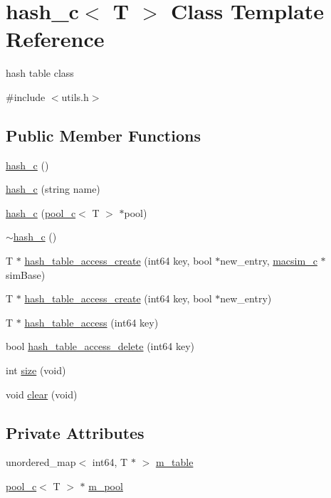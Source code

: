 \hypertarget{classhash__c}{
\section{hash\_\-c$<$ T $>$ Class Template Reference}
\label{classhash__c}
}


hash table class  




{\ttfamily \#include $<$utils.h$>$}

\subsection*{Public Member Functions}
\begin{DoxyCompactItemize}
\item 
\hyperlink{classhash__c_a0f4f335edcb32e2fdb006672e7326f49}{hash\_\-c} ()
\item 
\hyperlink{classhash__c_a9a52bfdeecbc6f7db1aec20febf5cbbf}{hash\_\-c} (string name)
\item 
\hyperlink{classhash__c_a9079a2d95bdb17c6f09b81676b6061c5}{hash\_\-c} (\hyperlink{classpool__c}{pool\_\-c}$<$ T $>$ $\ast$pool)
\item 
\hyperlink{classhash__c_a4784bb9b3bba26f1ce111b6321632c38}{$\sim$hash\_\-c} ()
\item 
T $\ast$ \hyperlink{classhash__c_a60af36fa5543c99fada8b0f2306ec1a7}{hash\_\-table\_\-access\_\-create} (int64 key, bool $\ast$new\_\-entry, \hyperlink{classmacsim__c}{macsim\_\-c} $\ast$simBase)
\item 
T $\ast$ \hyperlink{classhash__c_a866bf39c8a78a84e5fcbd0d45b8258ac}{hash\_\-table\_\-access\_\-create} (int64 key, bool $\ast$new\_\-entry)
\item 
T $\ast$ \hyperlink{classhash__c_aedd44bd0a0770db07e08b611c660380c}{hash\_\-table\_\-access} (int64 key)
\item 
bool \hyperlink{classhash__c_ae1d56ef0c2b5f3347bee72d46f9ff849}{hash\_\-table\_\-access\_\-delete} (int64 key)
\item 
int \hyperlink{classhash__c_a5d72471e005f8b2428c1a13ec707ea49}{size} (void)
\item 
void \hyperlink{classhash__c_ae9ae20e4edfb9e27a085a6dee7febc6c}{clear} (void)
\end{DoxyCompactItemize}
\subsection*{Private Attributes}
\begin{DoxyCompactItemize}
\item 
unordered\_\-map$<$ int64, T $\ast$ $>$ \hyperlink{classhash__c_a236ffec711b4d2fdee1976aed4a515d0}{m\_\-table}
\item 
\hyperlink{classpool__c}{pool\_\-c}$<$ T $>$ $\ast$ \hyperlink{classhash__c_a2eae988c3f90632b9addbfd17bfa11c7}{m\_\-pool}
\end{DoxyCompactItemize}


